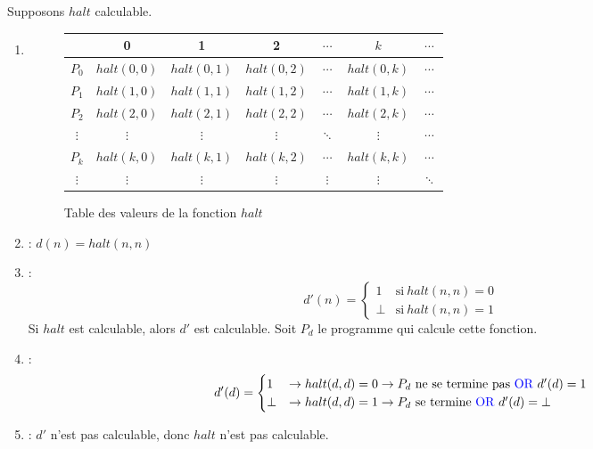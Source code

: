 Supposons $halt$ calculable.

\begin{enumerate}
\item {}
	\begin{figure}[H]
    		\centering
    		\begin{tabular}{c|cccccc}
		 & 0 & 1 & 2 & $\cdots$ & $k$ & $\cdots$ \\ 
		\hline 
		$P_0$ & $halt(0,0)$ & $halt(0,1)$ & $halt(0,2)$ & $\cdots$ & $halt(0,k)$ & $\cdots$ \\ 
		$P_1$ & $halt(1,0)$ & $halt(1,1)$ & $halt(1,2)$ & $\cdots$ & $halt(1,k)$ & $\cdots$ \\ 
		$P_2$ & $halt(2,0)$ & $halt(2,1)$ & $halt(2,2)$ & $\cdots$ & $halt(2,k)$ & $\cdots$ \\ 
		$\vdots$ & $\vdots$ & $\vdots$ & $\vdots$ & $\ddots$ & $\vdots$ & $\cdots$ \\ 
		$P_k$ & $halt(k,0)$ & $halt(k,1)$ & $halt(k,2)$ & $\cdots$ & $halt(k,k)$ & $\cdots$ \\ 
		$\vdots$ & $\vdots$ & $\vdots$ & $\vdots$ & $\vdots$ & $\vdots$ & $\ddots$ \\ 
		\end{tabular}
		\caption{Table des valeurs de la fonction $halt$}
	\end{figure}
\item {} : $d(n) = halt(n,n)$
\item {} :
	\begin{equation*}
		d'(n)=
		\begin{cases}
      		1 & \text{si}\ halt(n, n) = 0\\
      		\bot & \text{si}\ halt(n,n) = 1
      	\end{cases}
    \end{equation*}
    Si $halt$ est calculable, alors $d'$ est calculable. Soit $P_d$ le programme qui calcule cette fonction.
\item {} :
	\begin{equation*}
		d'(d)=
		\begin{cases}
      		1 & \rightarrow halt(d,d) = 0 \rightarrow P_d \text{ ne se termine pas \blue{OR} }d'(d) = 1\\
      		\bot & \rightarrow halt(d,d) = 1 \rightarrow P_d \text{ se termine \blue{OR} }d'(d) = \bot
      	\end{cases}
    \end{equation*}
\item {} : $d'$ n'est pas calculable, donc $halt$ n'est pas calculable.
\end{enumerate}

